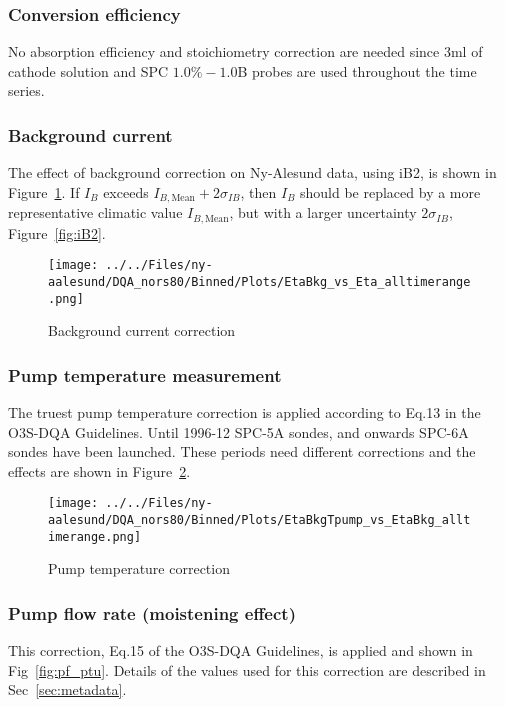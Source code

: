 \documentclass{article}
\begin{document}
%
\subsubsection{Conversion efficiency}
No absorption efficiency and stoichiometry correction are needed since 3ml of cathode solution and SPC
$1.0\%-1.0$B probes are used throughout the time series.
%

\subsubsection{Background current}
The effect of background correction on Ny-Alesund data, using iB2, is shown in Figure~\ref{fig:bkg}.
    If $I_B$ exceeds $I_{B,\text{Mean}}+2\sigma_{IB}$, then $I_B$
    should be replaced by a more representative climatic value $I_{B,\text{Mean}}$, but with a
    larger uncertainty $2\sigma_{IB}$, Figure~\ref{fig:iB2}.


\begin{figure}
\centering
\texttt{[image: ../../Files/ny-aalesund/DQA\_nors80/Binned/Plots/EtaBkg\_vs\_Eta\_alltimerange.png]}
\caption{Background current correction}
\label{fig:bkg}
\end{figure}
\subsubsection{Pump temperature measurement}

The truest pump temperature correction is applied according to Eq.13 in the O3S-DQA Guidelines.
Until 1996-12 SPC-5A sondes, and onwards  SPC-6A sondes have been launched.
These periods need different corrections and the effects are shown in Figure~\ref{fig:tpump}.


\begin{figure}
\centering
\texttt{[image: ../../Files/ny-aalesund/DQA\_nors80/Binned/Plots/EtaBkgTpump\_vs\_EtaBkg\_alltimerange.png]}
\caption{Pump temperature correction }
\label{fig:tpump}
\end{figure}
\subsubsection{Pump flow rate (moistening effect)}
This correction, Eq.15 of the O3S-DQA Guidelines, is applied and shown in Fig~\ref{fig:pf_ptu}.
Details of the values used for this correction are described in Sec~\ref{sec:metadata}.
\end{document}

